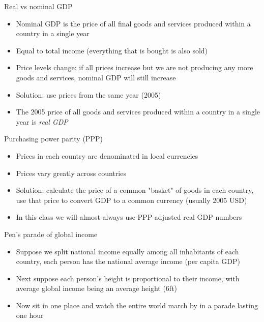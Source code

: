\documentclass[10pt]{beamer}
\begin{document}
\begin{frame}[label={sec:orgeee0217}]{}
\alert{Real vs nominal GDP}
\begin{itemize}
\item Nominal GDP is the price of all final goods and services produced within a country in a single year
\item Equal to total income (everything that is bought is also sold)
\item Price levels change: if all prices increase but we are not producing any more goods and services, nominal GDP will still increase
\item Solution: use prices from the same year (2005)
\item The \alert{\alert{2005 price}} of all goods and services produced within a country in a single year is \emph{real GDP}
\end{itemize}
\end{frame}

\begin{frame}[label={sec:org22cb917}]{}
\alert{Purchasing power parity (PPP)}
\begin{itemize}
\item Prices in each country are denominated in local currencies
\item Prices vary greatly across countries
\item Solution: calculate the price of a common "basket" of goods in each country, use that price to convert GDP to a common currency (usually 2005 USD)
\item In this class we will almost always use PPP adjusted real GDP numbers
\end{itemize}
\end{frame}

\begin{frame}[label={sec:org1ff3971}]{}
\alert{Pen's parade of global income}
\begin{itemize}
\item Suppose we split national income equally among all inhabitants of each country, each person has the national average income (per capita GDP)
\item Next suppose each person's height is proportional to their income, with average global income being an average height (6ft)
\item Now sit in one place and watch the entire world march by in a parade lasting one hour
\end{itemize}
\end{frame}
\end{document}
